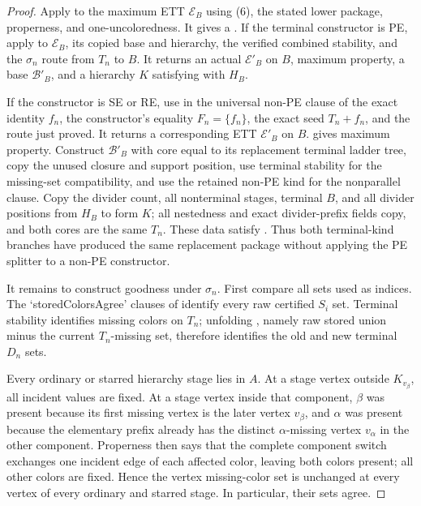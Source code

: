 \begin{proof}
Apply  to the maximum ETT $\mathcal E_B$ using (6), the
stated lower package, properness, and one-uncoloredness.  It gives a
.  If the terminal constructor is PE, apply
 to $\mathcal E_B$, its copied base and
hierarchy, the verified combined stability, and the $\sigma_n$ route
from $T_n$ to $B$.  It returns an actual
 $\mathcal E'_B$ on $B$,
maximum property, a base $\mathcal B'_B$, and a hierarchy $K$ satisfying
 with $H_B$.

If the constructor is SE or RE, use in the universal non-PE clause of
 the exact identity $f_n$, the constructor's
equality $F_n=\{f_n\}$, the exact seed $T_n+f_n$, and the route just
proved.  It returns a corresponding ETT $\mathcal E'_B$ on $B$.
 gives maximum property.  Construct
$\mathcal B'_B$ with core equal to its replacement terminal ladder tree,
copy the unused closure and support position, use terminal stability for
the missing-set compatibility, and use the retained non-PE kind for the
nonparallel clause.  Copy the divider count, all nonterminal stages,
terminal $B$, and all divider positions from $H_B$ to form $K$; all
nestedness and exact divider-prefix fields copy, and both cores are the
same $T_n$.  These data satisfy
.  Thus both terminal-kind branches have
produced the same replacement package without applying the PE splitter
to a non-PE constructor.

It remains to construct goodness under $\sigma_n$.  First compare all
sets used as indices.  The `storedColorsAgree' clauses of
 identify every raw certified
$S_i$ set.  Terminal stability identifies missing colors on $T_n$;
unfolding , namely raw stored union minus
the current $T_n$-missing set, therefore identifies the old and new
terminal $D_n$ sets.

Every ordinary or starred hierarchy stage lies in $A$.  At a stage
vertex outside $K_{v_\beta}$, all incident values are fixed.  At a stage
vertex inside that component, $\beta$ was present because its first
missing vertex is the later vertex $v_\beta$, and $\alpha$ was present
because the elementary prefix already has the distinct
$\alpha$-missing vertex $v_\alpha$ in the other component.  Properness
then says that the complete component switch exchanges one incident edge
of each affected color, leaving both colors present; all other colors are
fixed.  Hence the vertex missing-color set is unchanged at every vertex
of every ordinary and starred stage.  In particular, their
 sets agree.


\end{proof}
